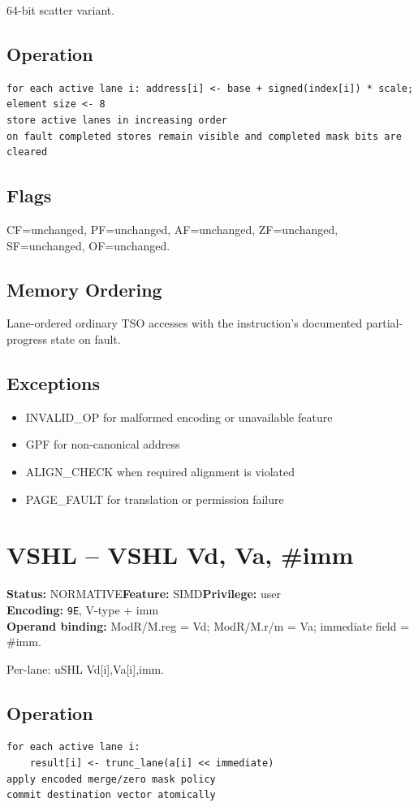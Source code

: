 \documentclass[10pt]{article}
\begin{document}
64-bit scatter variant.

\subsection*{Operation}
\begin{lstlisting}
for each active lane i: address[i] <- base + signed(index[i]) * scale; element size <- 8
store active lanes in increasing order
on fault completed stores remain visible and completed mask bits are cleared
\end{lstlisting}
\subsection*{Flags}
CF=unchanged, PF=unchanged, AF=unchanged, ZF=unchanged, SF=unchanged, OF=unchanged.
\subsection*{Memory Ordering}
Lane-ordered ordinary TSO accesses with the instruction's documented partial-progress state on fault.
\subsection*{Exceptions}
\begin{itemize}
\item INVALID\_OP for malformed encoding or unavailable feature
\item GPF for non-canonical address
\item ALIGN\_CHECK when required alignment is violated
\item PAGE\_FAULT for translation or permission failure
\end{itemize}
\clearpage

\section{VSHL -- VSHL Vd, Va, \#imm}
\textbf{Status:} NORMATIVE\quad \textbf{Feature:} SIMD\quad \textbf{Privilege:} user\\
\textbf{Encoding:} \texttt{9E}, V-type + imm\\
\textbf{Operand binding:} ModR/M.reg = Vd; ModR/M.r/m = Va; immediate field = \#imm.

Per-lane: uSHL Vd[i],Va[i],imm.

\subsection*{Operation}
\begin{lstlisting}
for each active lane i:
    result[i] <- trunc_lane(a[i] << immediate)
apply encoded merge/zero mask policy
commit destination vector atomically
\end{lstlisting}
\end{document}

